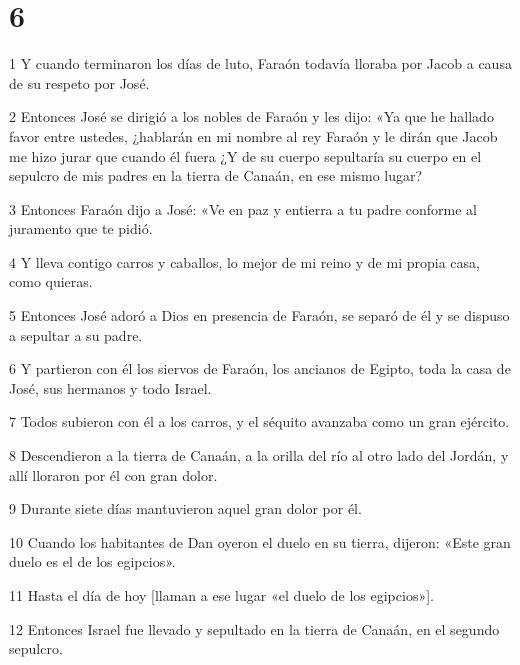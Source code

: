 \chapter{6}

\par 1 Y cuando terminaron los días de luto, Faraón todavía lloraba por Jacob a causa de su respeto por José.

\par 2 Entonces José se dirigió a los nobles de Faraón y les dijo: «Ya que he hallado favor entre ustedes, ¿hablarán en mi nombre al rey Faraón y le dirán que Jacob me hizo jurar que cuando él fuera ¿Y de su cuerpo sepultaría su cuerpo en el sepulcro de mis padres en la tierra de Canaán, en ese mismo lugar?

\par 3 Entonces Faraón dijo a José: «Ve en paz y entierra a tu padre conforme al juramento que te pidió.

\par 4 Y lleva contigo carros y caballos, lo mejor de mi reino y de mi propia casa, como quieras.

\par 5 Entonces José adoró a Dios en presencia de Faraón, se separó de él y se dispuso a sepultar a su padre.

\par 6 Y partieron con él los siervos de Faraón, los ancianos de Egipto, toda la casa de José, sus hermanos y todo Israel.

\par 7 Todos subieron con él a los carros, y el séquito avanzaba como un gran ejército.

\par 8 Descendieron a la tierra de Canaán, a la orilla del río al otro lado del Jordán, y allí lloraron por él con gran dolor.

\par 9 Durante siete días mantuvieron aquel gran dolor por él.

\par 10 Cuando los habitantes de Dan oyeron el duelo en su tierra, dijeron: «Este gran duelo es el de los egipcios».

\par 11 Hasta el día de hoy [llaman a ese lugar «el duelo de los egipcios»].

\par 12 Entonces Israel fue llevado y sepultado en la tierra de Canaán, en el segundo sepulcro.

